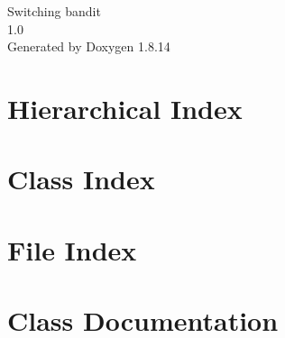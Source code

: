\documentclass[twoside]{book}
\newcommand{\+}{\discretionary{\mbox{\scriptsize$\hookleftarrow$}}{}{}}
\newcommand{\clearemptydoublepage}{%
  \newpage{\pagestyle{empty}\cleardoublepage}%
}
\begin{document}
\hypersetup{pageanchor=false,
             bookmarksnumbered=true,
             pdfencoding=unicode
            }
\begin{titlepage}
\vspace*{7cm}
\begin{center}%
{\Large Switching bandit \\[1ex]\large 1.\+0 }\\
\vspace*{1cm}
{\large Generated by Doxygen 1.8.14}\\
\end{center}
\end{titlepage}
\clearemptydoublepage
{}
\tableofcontents
\clearemptydoublepage
{}
\hypersetup{pageanchor=true}

\chapter{Hierarchical Index}

\chapter{Class Index}

\chapter{File Index}

\chapter{Class Documentation}










































\end{document}
